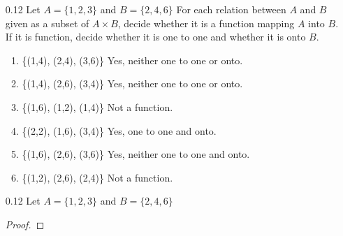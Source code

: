 \documentclass[12pt]{article}
\begin{document}
\begin{enumerate}
	\item[0.12] Let $A = \{1,2,3\}$ and $B = \{2,4,6\}$ For each relation between $A$ and $B$ given as a subset of $ A \times B$, decide whether it is a function mapping $A$ into $B$. If it is function, decide whether it is one to one and whether it is onto $B$.
	\begin{enumerate}
		\item \{(1,4), (2,4), (3,6)\} \quad Yes, neither one to one or onto.
		\item \{(1,4), (2,6), (3,4)\} \quad Yes, neither one to one or onto.
		\item \{(1,6), (1,2), (1,4)\} \quad Not a function.
		\item \{(2,2), (1,6), (3,4)\} \quad Yes, one to one and onto.
		\item \{(1,6), (2,6), (3,6)\} \quad Yes, neither one to one and onto.
		\item \{(1,2), (2,6), (2,4)\} \quad Not a function.
	\end{enumerate}

		\item[0.12] Let $A = \{1,2,3\}$ and $B = \{2,4,6\}$
	\begin{equation}
	\label{0.}
	
	\end{equation}
	
	\begin{proof}
		
	\end{proof}
\end{enumerate}
\end{document}
